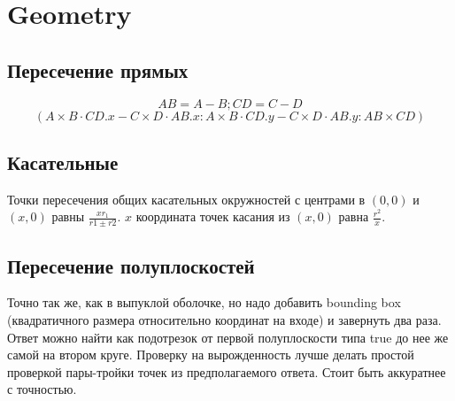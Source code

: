 \section{Geometry}

\subsection{Пересечение прямых}

\begin{equation*}
    AB = A - B; CD = C - D
\end{equation*}
\begin{equation*}
    (A \times B \cdot CD.x - C \times D \cdot AB.x : A \times B \cdot CD.y - C \times D \cdot AB.y : AB \times CD)
\end{equation*}

\subsection{Касательные}

Точки пересечения общих касательных окружностей с центрами в $(0, 0)$ и $(x, 0)$ равны $\frac{x r_1}{r1 \pm r2}$.
$x$ координата точек касания из $(x, 0)$ равна $\frac{r^2}{x}$.

\subsection{Пересечение полуплоскостей}

Точно так же, как в выпуклой оболочке, но надо добавить bounding box (квадратичного размера относительно координат на входе) и завернуть два раза.
Ответ можно найти как подотрезок от первой полуплоскости типа true до нее же самой на втором круге.
Проверку на вырожденность лучше делать простой проверкой пары-тройки точек из предполагаемого ответа. Стоит быть аккуратнее с точностью.
